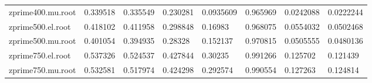 \begin{table}[]
\begin{tabular}{llllllll}
    zprime400.mu.root  & 0.339518   & 0.335549   & 0.230281   & 0.0935609   & 0.965969 & 0.0242088   & 0.0222244     \\
    zprime500.el.root  & 0.418102   & 0.411958   & 0.298848   & 0.16983     & 0.968075 & 0.0554032   & 0.0502468     \\
    zprime500.mu.root  & 0.401054   & 0.394935   & 0.28328    & 0.152137    & 0.970815 & 0.0505555   & 0.0480136     \\
    zprime750.el.root  & 0.537326   & 0.524537   & 0.427844   & 0.30235     & 0.991266 & 0.125702    & 0.121439      \\
    zprime750.mu.root  & 0.532581   & 0.517974   & 0.424298   & 0.292574    & 0.990554 & 0.127263    & 0.124814     
    \end{tabular}
    \end{table}